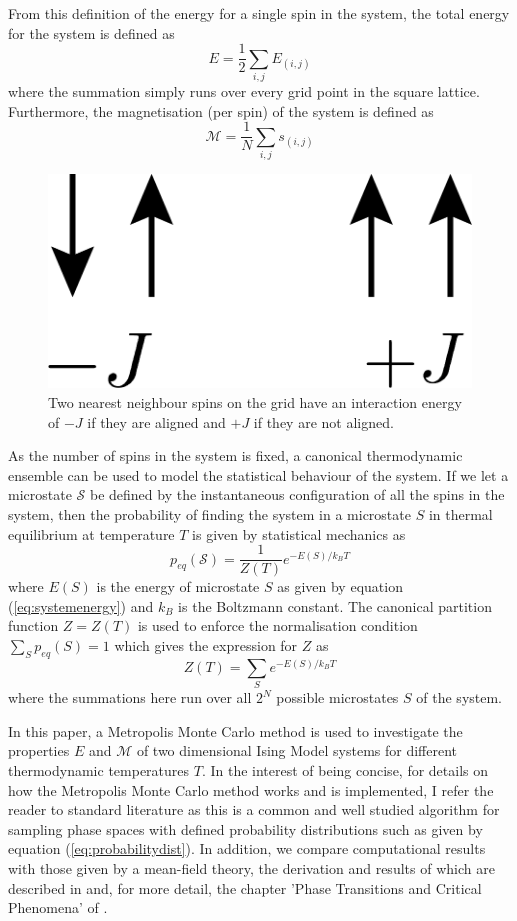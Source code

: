 \documentclass[11pt]{iopart}
\begin{document}
From this definition of the energy for a single spin in the system, the total energy for the system is defined as
\begin{equation}
\label{eq:systemenergy}
E = \frac{1}{2} \sum_{i, j} E_{(i, j)}
\end{equation}
where the summation simply runs over every grid point in the square lattice.
Furthermore, the magnetisation (per spin) of the system is defined as
\begin{equation}
\mathcal{M} = \frac{1}{N} \sum_{i, j} s_{(i, j)}
\end{equation}

\begin{figure}[t]
  \centering
  \includegraphics[width=0.2\linewidth]{images/spins/4x/spins@4x.png}
  \caption{Two nearest neighbour spins on the grid have an interaction energy of $-J$ if they are aligned and $+J$ if they are not aligned.}
  \label{fig:spinalignment}
\end{figure}

As the number of spins in the system is fixed, a canonical thermodynamic ensemble can be used to model the statistical behaviour of the system. If we let a microstate $\mathcal{S}$ be defined by the instantaneous configuration of all the spins in the system, then the probability of finding the system in a microstate $S$ in thermal equilibrium at temperature $T$ is given by statistical mechanics as \cite{statmech} \cite{handout}
\begin{equation}
\label{eq:probabilitydist}
p_{eq}(\mathcal{S}) = \frac{1}{Z(T)} e^{-E(S)/k_B T}
\end{equation}
where $E(S)$ is the energy of microstate $S$ as given by equation (\ref{eq:systemenergy}) and $k_B$ is the Boltzmann constant. The canonical partition function $Z = Z(T)$ is used to enforce the normalisation condition $\sum_S{p_{eq}(S)} = 1$ which gives the expression for $Z$ as
\begin{equation}
Z(T) = \sum_{S} e^{-E(S)/k_B T}
\end{equation}
where the summations here run over all $2^N$ possible microstates $S$ of the system.

In this paper, a Metropolis Monte Carlo method is used to investigate the properties $E$ and $\mathcal{M}$ of two dimensional Ising Model systems for different thermodynamic temperatures $T$. In the interest of being concise, for details on how the Metropolis Monte Carlo method works and is implemented, I refer the reader to standard literature \cite{montecarlo} as this is a common and well studied algorithm for sampling phase spaces with defined probability distributions such as given by equation (\ref{eq:probabilitydist}). In addition, we compare computational results with those given by a mean-field theory, the derivation and results of which are described in \cite{handout} and, for more detail, the chapter 'Phase Transitions and Critical Phenomena' of \cite{meanfield}.
\end{document}
